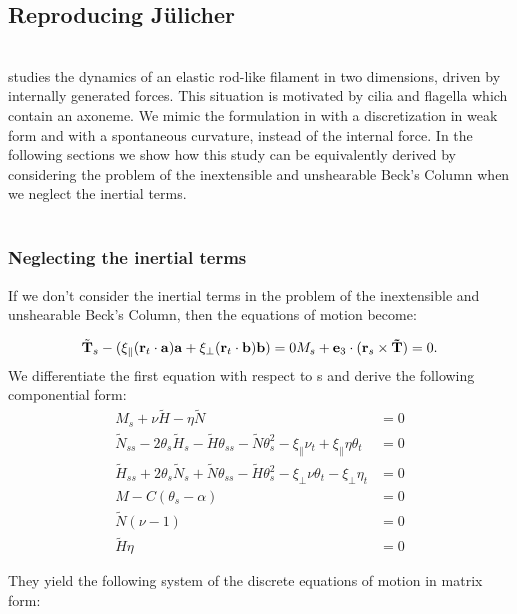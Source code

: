 
\subsection{Reproducing Jülicher}
\\
\cite{julicher} studies the dynamics of an elastic rod-like filament in two dimensions, driven by internally generated forces. This situation is motivated by cilia and flagella which contain an axoneme. We mimic the formulation in \cite{julicher} with a discretization in weak form and with a spontaneous curvature, instead of the internal force. In the following sections we show how this study can be equivalently derived by considering the problem of the inextensible and unshearable Beck’s Column when we neglect the inertial terms.
\\\\
\subsubsection{Neglecting the inertial terms}
If we don't consider the inertial terms in the problem of the inextensible and unshearable Beck’s Column, then the equations of motion become:

\[ \tilde{\mathbf{T}}_s - (\xi_\parallel (\mathbf{r}_t\cdot\mathbf{a})\mathbf{a} + \xi_\perp (\mathbf{r}_t\cdot\mathbf{b})\mathbf{b}) = 0\\

M_s + \mathbf{e}_3 \cdot(\mathbf{r}_s \times \mathbf{\tilde{T}}) = 0.
\]
We differentiate the first equation with respect to s and derive the following componential form:
\begin{align}
M_s + \nu \tilde{H} -\eta \tilde{N} 
&= 0\\
\tilde{N}_{ss} - 2\theta_s\tilde{H}_s - \tilde{H}\theta_{ss}- \tilde{N}\theta_s^2
- \xi_{\parallel}\nu_t + \xi_{\parallel}\eta\theta_t &= 0\\
\tilde{H}_{ss} + 2\theta_s\tilde{N}_s + \tilde{N}\theta_{ss} - \tilde{H}\theta_s^2  - \xi_{\perp}\nu\theta_t - \xi_{\perp}\eta_t
&= 0\\
M - C(\theta_s -\alpha)  &= 0\\
\tilde{N}(\nu - 1) &= 0\\
\tilde{H}\eta &= 0
\end{align}

They yield the following system of the discrete equations of motion in matrix form:

